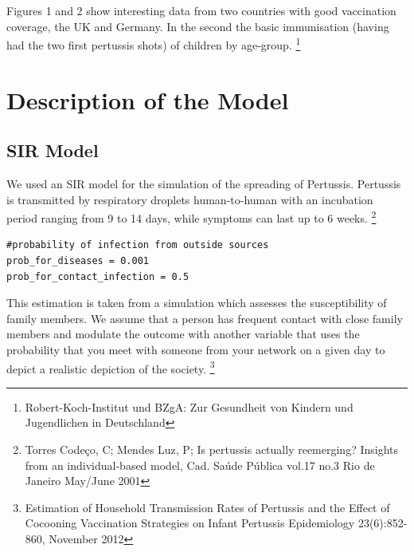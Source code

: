 \documentclass[11pt]{article}
\begin{document}
Figures 1 and 2 show interesting data from two countries with good vaccination coverage, the UK and Germany. In the second the basic immunisation (having had the two first pertussis shots) of children by age-group. \footnote{Robert-Koch-Institut und BZgA: Zur Gesundheit von Kindern und Jugendlichen in Deutschland}



\section{Description of the Model}

\subsection{SIR Model}

We used an SIR model for the simulation of the spreading of Pertussis. Pertussis is transmitted by respiratory droplets human-to-human with an incubation period ranging from 9 to 14 days, while symptoms can last up to 6 weeks. \footnote{Torres Codeço, C; Mendes Luz, P; Is pertussis actually reemerging? Insights from an individual-based model, Cad. Saúde Pública vol.17 no.3 Rio de Janeiro May/June 2001}

\begin{lstlisting}
#probability of infection from outside sources
prob_for_diseases = 0.001 
prob_for_contact_infection = 0.5
\end{lstlisting}

This estimation is taken from a simulation which assesses the susceptibility of family members. We assume that a person has frequent contact with close family members and modulate the outcome with another variable that uses the probability that you meet with someone from your network on a given day to depict a realistic depiction of the society. 
\footnote{Estimation of Household Transmission Rates of Pertussis and the Effect of Cocooning Vaccination Strategies on Infant Pertussis Epidemiology 23(6):852-860, November 2012}
\vspace{14px}
\end{document}
